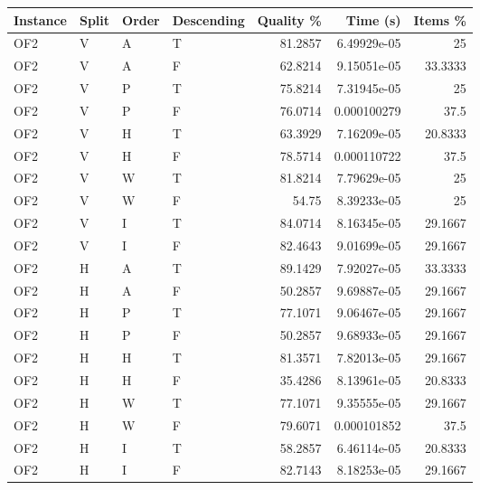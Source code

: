 \begin{tabular}{llllrrr}
    \hline
    Instance & Split & Order & Descending & Quality \% & Time (s)    & Items \% \\
    \hline
    OF2      & V     & A     & T          & 81.2857    & 6.49929e-05 & 25       \\
    OF2      & V     & A     & F          & 62.8214    & 9.15051e-05 & 33.3333  \\
    OF2      & V     & P     & T          & 75.8214    & 7.31945e-05 & 25       \\
    OF2      & V     & P     & F          & 76.0714    & 0.000100279 & 37.5     \\
    OF2      & V     & H     & T          & 63.3929    & 7.16209e-05 & 20.8333  \\
    OF2      & V     & H     & F          & 78.5714    & 0.000110722 & 37.5     \\
    OF2      & V     & W     & T          & 81.8214    & 7.79629e-05 & 25       \\
    OF2      & V     & W     & F          & 54.75      & 8.39233e-05 & 25       \\
    OF2      & V     & I     & T          & 84.0714    & 8.16345e-05 & 29.1667  \\
    OF2      & V     & I     & F          & 82.4643    & 9.01699e-05 & 29.1667  \\
    OF2      & H     & A     & T          & 89.1429    & 7.92027e-05 & 33.3333  \\
    OF2      & H     & A     & F          & 50.2857    & 9.69887e-05 & 29.1667  \\
    OF2      & H     & P     & T          & 77.1071    & 9.06467e-05 & 29.1667  \\
    OF2      & H     & P     & F          & 50.2857    & 9.68933e-05 & 29.1667  \\
    OF2      & H     & H     & T          & 81.3571    & 7.82013e-05 & 29.1667  \\
    OF2      & H     & H     & F          & 35.4286    & 8.13961e-05 & 20.8333  \\
    OF2      & H     & W     & T          & 77.1071    & 9.35555e-05 & 29.1667  \\
    OF2      & H     & W     & F          & 79.6071    & 0.000101852 & 37.5     \\
    OF2      & H     & I     & T          & 58.2857    & 6.46114e-05 & 20.8333  \\
    OF2      & H     & I     & F          & 82.7143    & 8.18253e-05 & 29.1667  \\

\end{tabular}
